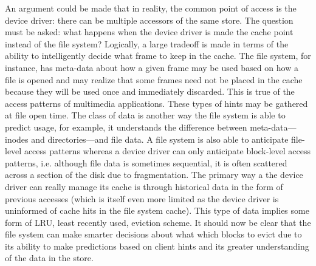 An argument could be made that in reality, the common point of access
is the device driver: there can be multiple accessors of the same
store.  The question must be asked: what happens when the device
driver is made the cache point instead of the file system?  Logically,
a large tradeoff is made in terms of the ability to intelligently
decide what frame to keep in the cache.  The file system, for
instance, has meta-data about how a given frame may be used based on
how a file is opened and may realize that some frames need not be
placed in the cache because they will be used once and immediately
discarded.  This is true of the access patterns of multimedia
applications.  These types of hints may be gathered at file open time.
The class of data is another way the file system is able to predict
usage, for example, it understands the difference between
meta-data---inodes and directories---and file data.  A file system is
also able to anticipate file-level access patterns whereas a device
driver can only anticipate block-level access patterns, i.e. although
file data is sometimes sequential, it is often scattered across a
section of the disk due to fragmentation.  The primary way a the
device driver can really manage its cache is through historical data
in the form of previous accesses (which is itself even more limited as
the device driver is uninformed of cache hits in the file system
cache).  This type of data implies some form of LRU, least recently
used, eviction scheme.  It should now be clear that the file system
can make smarter decisions about what which blocks to evict due to its
ability to make predictions based on client hints and its greater
understanding of the data in the store.

